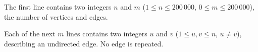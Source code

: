The first line contains two integers $n$ and $m$ ($1\le n\le 200\,000$, $0\le m\le 200\,000$), the number of vertices and edges.

Each of the next $m$ lines contains two integers $u$ and $v$ ($1\le u,v\le n$, $u\ne v$), describing an undirected edge. No edge is repeated.
